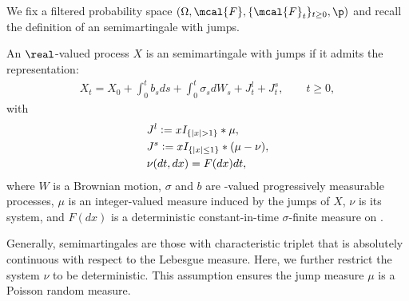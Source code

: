 We fix a filtered probability space $(\Omega, \mcal{F}, \{\mcal{F}_t\}_{t \ge 0}, \p)$ and  recall the definition of an \ito semimartingale with \levy jumps.  
\begin{defn}
  An $\real$-valued process $X$ is an \ito semimartingale with \levy jumps if it admits the representation:
  \begin{align}
    X_t = X_0 + \int^t_0 b_s ds + \int^t_0 \sigma_s d W_s  + J^l_t + J^s_t, \qquad t \ge 0, 
    \label{eq:semimartingale}
  \end{align}
  with 
  \begin{align}
    & J^l := x  I_{\{\vert x \vert > 1\}} \ast \mu, \notag \\
    & J^s := x  I_{\{\vert x \vert \le  1\}} \ast (\mu - \nu), \notag\\
    &\nu(dt, dx) = F(dx) dt, \notag
    \label{}
  \end{align}
  where $W$ is a Brownian motion, $\sigma$ and $b$ are \real-valued progressively measurable processes, $\mu$ is an integer-valued measure induced by the jumps  of $X$, $\nu$ is its \levy system, and $F(dx)$ is a  deterministic constant-in-time $\sigma$-finite measure on \real. 
\end{defn}
\begin{remark}
  Generally, \ito semimartingales are those with characteristic triplet  that is absolutely continuous with respect to the Lebesgue measure. Here, we further restrict the \levy system $\nu$ to be deterministic. This assumption ensures the jump measure $\mu$ is a Poisson random measure. 
\end{remark}

